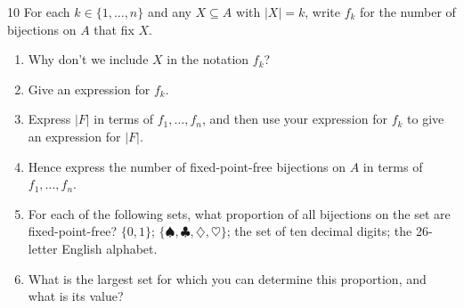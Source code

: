 \begin{exercise}{10}
    For each $k\in\{1,\dots,n\}$ and any $X\subseteq A$ with $|X|=k$, write $f_k$
    for the number of bijections on $A$ that fix $X$.
    \begin{enumerate}[label=(\alph*)]
        \item Why don't we include $X$ in the notation $f_k$?
        \item Give an expression for $f_k$.
        \item Express $|F|$ in terms of $f_1,\dots,f_n$, and then use your
              expression for $f_k$ to give an expression for $|F|$.
        \item Hence express the number of fixed-point-free bijections on $A$ in
              terms of $f_1,\dots,f_n$.
        \item For each of the following sets, what proportion of all bijections
              on the set are fixed-point-free?
              $\{0,1\}$; $\{\spadesuit,\clubsuit,\diamondsuit,\heartsuit\}$; the
              set of ten decimal digits; the 26-letter English alphabet.
        \item What is the largest set for which you can determine this
              proportion, and what is its value?
    \end{enumerate}
\end{exercise}
\begin{solbox}
\begin{solution}[(a)]

\end{solution}
\begin{solution}[(b)]

\end{solution}
\begin{solution}[(c)]

\end{solution}
\begin{solution}[(d)]

\end{solution}
\begin{solution}[(e)]

\end{solution}
\begin{solution}[(f)]

\end{solution}
\end{solbox}

